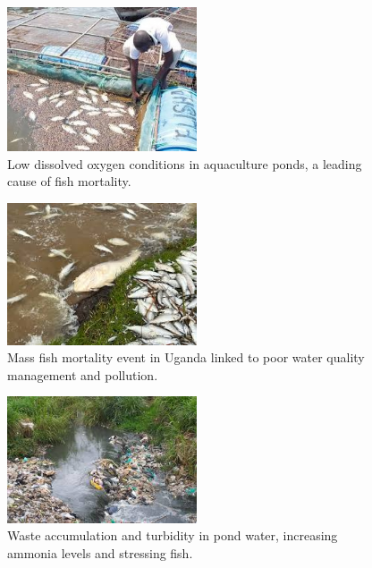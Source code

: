 \documentclass[12pt,a4paper]{report}
\begin{document}
\begin{figure}[H]
    \centering
    \includegraphics[width=0.5\textwidth]{img/low level.jpg}
    \caption{Low dissolved oxygen conditions in aquaculture ponds, a leading cause of fish mortality.}
    \label{fig:oxygen}
\end{figure}

\begin{figure}[H]
    \centering
    \includegraphics[width=0.5\textwidth]{img/dead fish.jpg}
    \caption{Mass fish mortality event in Uganda linked to poor water quality management and pollution.}
    \label{fig:deadfish}
\end{figure}

\begin{figure}[H]
    \centering
    \includegraphics[width=0.5\textwidth]{img/waste.jpg}
    \caption{Waste accumulation and turbidity in pond water, increasing ammonia levels and stressing fish.}
    \label{fig:waste}
\end{figure}
\end{document}
